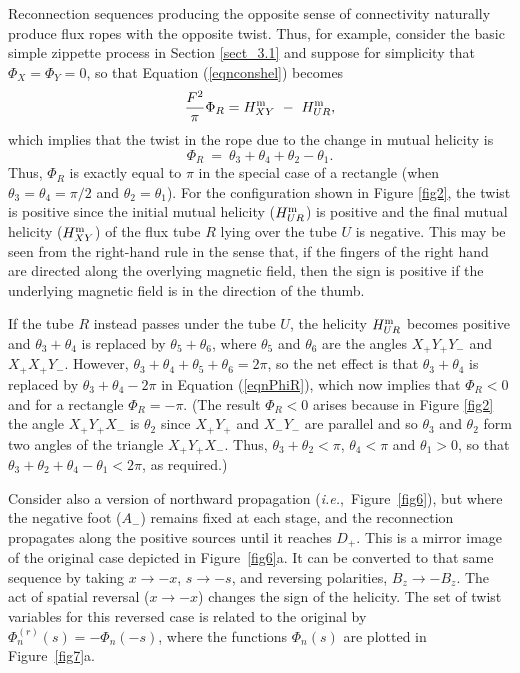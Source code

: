 \documentclass[10pt,namedreferneces]{SolarPhysics}
\begin{document}
\begin{article}
Reconnection sequences producing the opposite sense of connectivity naturally produce flux ropes with the opposite twist.  
Thus, for example, consider the basic simple zippette process in Section \ref{sect_3.1} and suppose for simplicity that $\Phi_X=\Phi_Y=0$, so that Equation (\ref{eqnconshel}) becomes
\begin{equation}
 {F^2\over\pi}\Phi_R =H^{\rm m}_{XY} ~-~ H^{\rm m}_{UR},
\end{equation}
which implies that the twist in the rope due to the change in mutual helicity is
\begin{equation}
  \Phi_R ~=~ \theta_3+\theta_4+\theta_2-\theta_1.
  \label{eqnPhiR}
\end{equation}
Thus, $\Phi_R $ is exactly equal to $\pi$ in the special case of a rectangle (when $\theta_3=\theta_4=\pi/2$ and $\theta_2=\theta_1$).
For the configuration shown in Figure \ref{fig2}, the twist is positive since the initial mutual helicity ($H^{\rm m}_{UR}$) is positive and the final mutual helicity ($H^{\rm m}_{XY}$) of the flux tube $R$ lying over the tube $U$ is negative. This may be seen from the right-hand rule in the sense that, if the fingers of the right hand are directed along the overlying magnetic field, then the sign is positive if the underlying magnetic field is in the direction of the thumb.

If the tube $R$ instead passes under the tube $U$, the helicity $H^{\rm m}_{UR}$ becomes positive and $\theta_3+\theta_4$ is replaced by $\theta_5+\theta_6$,  where $\theta_5$ and $\theta_6$ are the angles $X_+Y_+Y_-$ and $X_+X_+Y_-$.  However, $\theta_3+\theta_4+\theta_5+\theta_6=2\pi$, so the net effect is that $\theta_3+\theta_4$ is replaced by $\theta_3+\theta_4-2\pi$ in Equation (\ref{eqnPhiR}), which now implies that $\Phi_R<0$ and for a rectangle $\Phi_R=-\pi$. (The result $\Phi_R<0$ arises because in Figure \ref{fig2} the angle $X_+Y_+X_-$ is $\theta_2$ since $X_+Y_+$ and $X_-Y_-$ are parallel and so $\theta_3$ and $\theta_2$ form two angles of the triangle $X_+Y_+X_-$. Thus, $\theta_3+\theta_2<\pi$, $\theta_4<\pi$ and $\theta_1>0$,  so that $\theta_3+\theta_2+\theta_4-\theta_1<2\pi$, as required.)

Consider also a version of northward propagation (\textit{i.e.},\ Figure\ \ref{fig6}), but where the negative foot ($A_-$) remains fixed at each stage, and the reconnection propagates along the positive sources until it reaches $D_+$.  This is a mirror image of the original case depicted in Figure\ \ref{fig6}a.  It can be converted to that same sequence by taking $x\to-x$, $s\to-s$, and reversing polarities, $B_z\to-B_z$.  The act of spatial reversal ($x\to-x$) changes the sign of the helicity.  The set of twist variables for this reversed case is related to the original by $\Phi_n^{(r)}(s)=-\Phi_n(-s)$, where the functions 
$\Phi_n(s)$ are plotted in Figure\ \ref{fig7}a.


\end{article}
\end{document}
